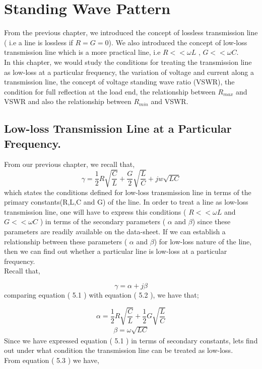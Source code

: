 \chapter{\textbf{Standing Wave Pattern}}
From the previous chapter, we introduced the concept of lossless transmission line ( i.e a line is lossless if $R=G=0$). We also introduced the concept of low-loss transmission line which is a more practical line, i.e $R << \omega L$
, $G << \omega C $.\\

In this chapter, we would study the conditions for treating the transmission line as low-loss at a particular frequency, the variation of voltage and current along a transmission line, the concept of voltage standing wave ratio (VSWR), the condition for full reflection at the load end, the relationship between $R_{max}$ and VSWR and also the relationship between $R_{min}$ and VSWR.
\section{Low-loss Transmission Line at a Particular Frequency.}
From our previous chapter, we recall that,
	\begin{equation}
	\gamma = \frac{1}{2}R\sqrt{\frac{C}{L}} + \frac{G}{2}\sqrt{\frac{L}{C}} +jw\sqrt{LC}
	\end{equation}
	which states the conditions defined for low-loss transmission line in terms of the primary constants(R,L,C and G) of the line. In order to treat a line as low-loss transmission line, one will have to express this conditions ( $R << \omega L$ and $G << \omega C$ ) in terms of the secondary parameters ( $\alpha$ and $\beta $) since these parameters are readily available on the data-sheet. If we can establish a relationship between these parameters ( $\alpha$ and $\beta $)
	 for low-loss nature of the line, then we can find out whether a particular line is low-loss at a particular frequency.\\
	Recall that,
	
	\begin{equation}
	\gamma = \alpha +j\beta
	\end{equation}
	comparing equation ( 5.1 ) with equation ( 5.2 ), we have that;
	 
	\begin{equation}
	\alpha = \frac{1}{2}R\sqrt{\frac{C}{L}} + \frac{1}{2}G\sqrt{\frac{L}{C}}	
	\end{equation}
	\begin{align}
	\beta = \omega\sqrt{LC}
	\end{align}
	Since we have expressed equation ( 5.1 ) in terms of secondary constants, lets find out under what condition the transmission line can be treated as low-loss.\\
	From equation ( 5.3 ) we have,
	
